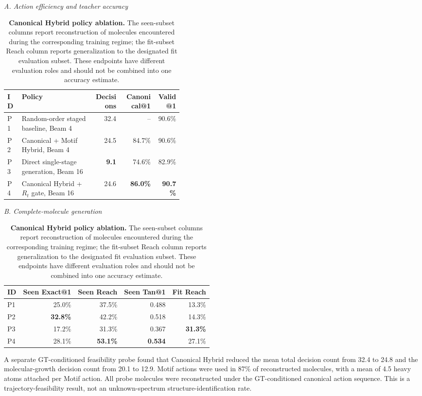 \begin{table}[!htbp]
\centering
\caption{\textbf{Canonical Hybrid policy ablation.}
The seen-subset columns report reconstruction of molecules encountered during
the corresponding training regime; the fit-subset Reach column reports
generalization to the designated fit evaluation subset. These endpoints have
different evaluation roles and should not be combined into one accuracy estimate.}
\label{tab:canonical_hybrid_ablation}
\small
\setlength{\tabcolsep}{3.5pt}
\renewcommand{\arraystretch}{1.10}
\noindent\textit{A. Action efficiency and teacher accuracy}\par\vspace{3pt}
\begin{tabular}{@{}lp{0.42\linewidth}rrr@{}}
\toprule
ID & Policy & Decisions & Canonical@1 & Valid@1 \\
\midrule
P1 & Random-order staged baseline, Beam 4 & 32.4 & -- & 90.6\% \\
P2 & Canonical + Motif Hybrid, Beam 4 & 24.5 & 84.7\% & 90.6\% \\
P3 & Direct single-stage generation, Beam 16 & \textbf{9.1} & 74.6\% & 82.9\% \\
P4 & Canonical Hybrid + $R_t$ gate, Beam 16 & 24.6 & \textbf{86.0\%} & \textbf{90.7\%} \\
\bottomrule
\end{tabular}
\par\vspace{8pt}
\noindent\textit{B. Complete-molecule generation}\par\vspace{3pt}
\begin{tabular}{@{}lrrrr@{}}
\toprule
ID & Seen Exact@1 & Seen Reach & Seen Tan@1 & Fit Reach \\
\midrule
P1 & 25.0\% & 37.5\% & 0.488 & 13.3\% \\
P2 & \textbf{32.8\%} & 42.2\% & 0.518 & 14.3\% \\
P3 & 17.2\% & 31.3\% & 0.367 & \textbf{31.3\%} \\
P4 & 28.1\% & \textbf{53.1\%} & \textbf{0.534} & 27.1\% \\
\bottomrule
\end{tabular}
\end{table}

A separate GT-conditioned feasibility probe found that Canonical Hybrid reduced
the mean total decision count from 32.4 to 24.8 and the molecular-growth decision
count from 20.1 to 12.9. Motif actions were used in 87\% of reconstructed molecules,
with a mean of 4.5 heavy atoms attached per Motif action. All probe molecules were
reconstructed under the GT-conditioned canonical action sequence. This is a
trajectory-feasibility result, not an unknown-spectrum structure-identification rate.

